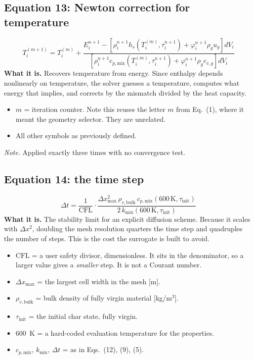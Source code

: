 \documentclass[11pt]{article}
\begin{document}
\subsection*{Equation 13: Newton correction for temperature}
\begin{equation}
T^{(m+1)}_i = T^{(m)}_i +
\frac{E^{n+1}_i - \left[\rho^{n+1}_i h_s(T^{(m)}_i, \tau^{n+1}_i)
  + \varphi^{n+1}_i \rho_g u_g\right] dV_i}
{\left[\rho^{n+1}_i c_{p,\mathrm{mix}}(T^{(m)}_i, \tau^{n+1}_i)
  + \varphi^{n+1}_i \rho_g c_{v,g}\right] dV_i}
\end{equation}
\textbf{What it is.} Recovers temperature from energy. Since enthalpy depends
nonlinearly on temperature, the solver guesses a temperature, computes what
energy that implies, and corrects by the mismatch divided by the heat capacity.
\begin{itemize}
  \item $m$ = iteration counter. Note this reuses the letter $m$ from Eq.~(1),
        where it meant the geometry selector. They are unrelated.
  \item All other symbols as previously defined.
\end{itemize}
\textit{Note.} Applied exactly three times with no convergence test.

\subsection*{Equation 14: the time step}
\begin{equation}
\Delta t = \frac{1}{\mathrm{CFL}} \cdot
\frac{\Delta x_{\max}^2\, \rho_{v,\mathrm{bulk}}\, c_{p,\mathrm{mix}}(600\,\mathrm{K}, \tau_{\mathrm{init}})}
{2\, k_{\mathrm{mix}}(600\,\mathrm{K}, \tau_{\mathrm{init}})}
\end{equation}
\textbf{What it is.} The stability limit for an explicit diffusion scheme. Because
it scales with $\Delta x^2$, doubling the mesh resolution quarters the time step
and quadruples the number of steps. This is the cost the surrogate is built to
avoid.
\begin{itemize}
  \item $\mathrm{CFL}$ = a user safety divisor, dimensionless. It sits in the
        denominator, so a larger value gives a \emph{smaller} step. It is not a
        Courant number.
  \item $\Delta x_{\max}$ = the largest cell width in the mesh [m].
  \item $\rho_{v,\mathrm{bulk}}$ = bulk density of fully virgin material
        [kg/m$^3$].
  \item $\tau_{\mathrm{init}}$ = the initial char state, fully virgin.
  \item $600$~K = a hard-coded evaluation temperature for the properties.
  \item $c_{p,\mathrm{mix}}$, $k_{\mathrm{mix}}$, $\Delta t$ = as in Eqs.~(12),
        (9), (5).
\end{itemize}
\end{document}
